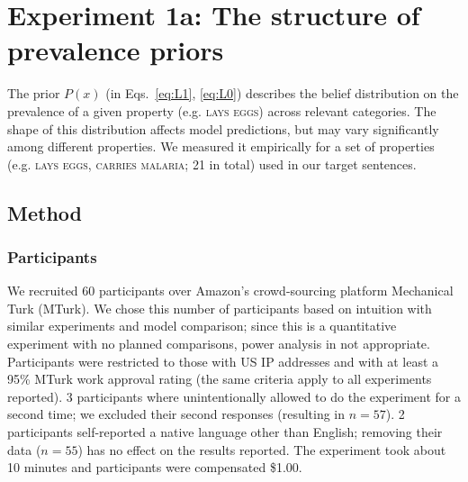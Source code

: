 \documentclass[12pt,letterpaper]{article}
\begin{document}
\section*{Experiment 1a: The structure of prevalence priors}

 The prior $P(x)$ (in Eqs.~\ref{eq:L1}, \ref{eq:L0}) describes the belief distribution on the prevalence of a given property (e.g. \textsc{lays eggs}) across relevant categories. 
The shape of this distribution affects model predictions, but may vary significantly among different properties.
 We measured it empirically for a set of properties (e.g. \textsc{lays eggs, carries malaria}; 21 in total) used in our target sentences. 
 
\subsection*{Method}

\subsubsection*{Participants}
We recruited 60 participants over Amazon's crowd-sourcing platform Mechanical Turk (MTurk).  
We chose this number of participants based on intuition with similar experiments and model comparison; 
since this is a quantitative experiment with no planned comparisons, power analysis in not appropriate.
Participants were restricted to those with US IP addresses and with at least a 95\% MTurk work approval rating (the same criteria apply to all experiments reported). 
3 participants where unintentionally allowed to do the experiment for a second time; we excluded their second responses (resulting in $n=57$).
2 participants self-reported a native language other than English; removing their data ($n=55$) has no effect on the results reported. 
The experiment took about 10 minutes and participants were compensated \$1.00.
\end{document}

